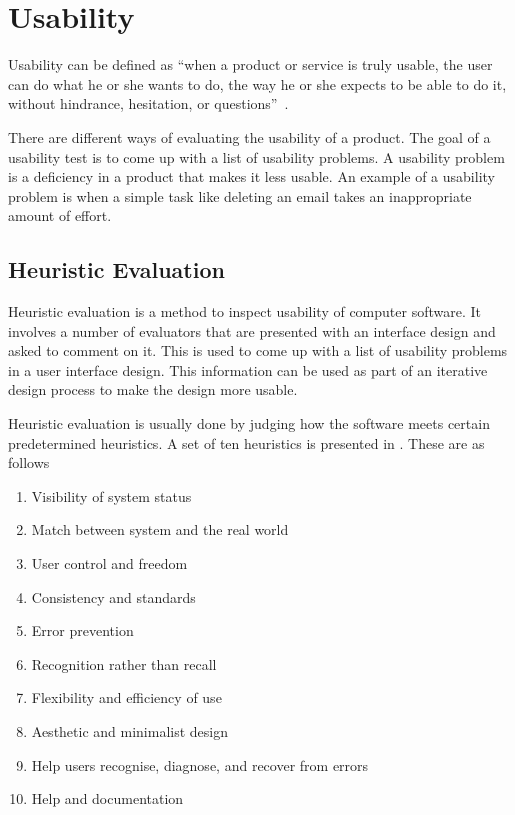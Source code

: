 \section{Usability}
\label{sub:usability}

Usability can be defined as \enquote{when a product or service is truly usable, the user can do what he or she wants to do, the way he or she expects to be able to do it, without hindrance, hesitation, or questions}~\cite{RubinChisnellSpool08}.

There are different ways of evaluating the usability of a product. The goal of a usability test is to come up with a list of usability problems. A usability problem is a deficiency in a product that makes it less usable. An example of a usability problem is when a simple task like deleting an email takes an inappropriate amount of effort.

\subsection{Heuristic Evaluation}
Heuristic evaluation is a method to inspect usability of computer
software. It involves a number of evaluators that are presented with
an interface design and asked to comment on it. This is used to come
up with a list of usability problems in a user interface design. This
information can be used as part of an iterative design process to make the design more usable.

Heuristic evaluation is usually done by judging how the software meets
certain predetermined heuristics. A set of ten heuristics
is presented in . These are as follows

\begin{enumerate}
  \item Visibility of system status
  \item Match between system and the real world
  \item User control and freedom
  \item Consistency and standards
  \item Error prevention
  \item Recognition rather than recall
  \item Flexibility and efficiency of use
  \item Aesthetic and minimalist design
  \item Help users recognise, diagnose, and recover from errors
  \item Help and documentation
\end{enumerate}

